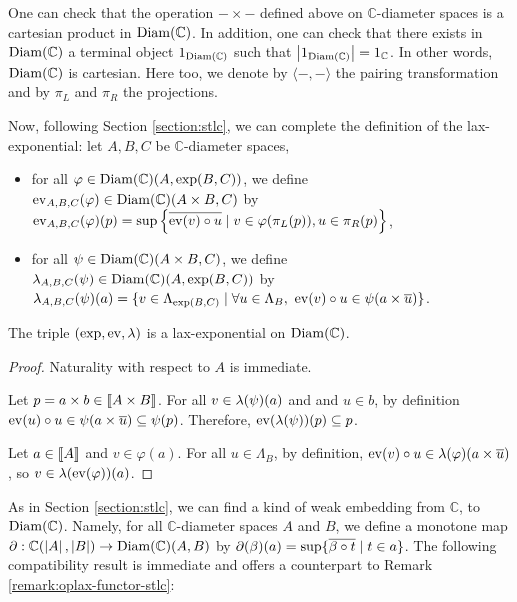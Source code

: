 One can check that the operation $-\times-$ defined above on $\mathbb{C}$-diameter spaces is a cartesian product in $\operatorname{Diam}(\mathbb{C})$. In addition, one can check that there exists in $\operatorname{Diam}(\mathbb{C})$ a terminal object $1_{\operatorname{Diam}(\mathbb{C})}$ such that $\left\vert1_{\operatorname{Diam}(\mathbb{C})}\right\vert = 1_{\mathbb{C}}$. In other words, $\operatorname{Diam}(\mathbb{C})$ is cartesian. Here too, we denote by $\langle-,-\rangle$ the pairing transformation and by $\pi_L$ and $\pi_R$ the projections.


Now, following Section \ref{section:stlc}, we can complete the definition of the lax-exponential: let $A,B,C$ be $\mathbb{C}$-diameter spaces, \begin{itemize}
\item for all $\varphi \in \operatorname{Diam}(\mathbb{C})(A, \exp(B, C))$, we define $\operatorname{ev}_{A,B,C}(\varphi) \in \operatorname{Diam}(\mathbb{C})\allowbreak(A \times B, C)$ by $\operatorname{ev}_{A,B,C}(\varphi)(p) = \sup\left\{ \overline{\operatorname{ev}(v) \circ u} \mid v \in \varphi(\pi_L(p)), u \in \pi_R(p) \right\}$,
\item for all $\psi \in \operatorname{Diam}(\mathbb{C})(A \times B, C)$, we define $\lambda_{A,B,C}(\psi) \in \operatorname{Diam}(\mathbb{C})(A,\allowbreak \exp(B, C))$ by $\lambda_{A,B,C}(\psi)(a) = \{ v \in \Lambda_{\exp(B, C)} \mid \forall u \in \Lambda_B,~ \operatorname{ev}(v) \circ u \in \psi(a \times \overline{u}) \}$.
\end{itemize}
 
 \begin{proposition} The triple $(\exp, \operatorname{ev}, \lambda)$ is a lax-exponential on $\operatorname{Diam}(\mathbb{C})$.
 \end{proposition}
 \begin{proof} Naturality with respect to $A$ is immediate.
 
Let $p = a \times b \in \llbracket A \times B \rrbracket$. For all $v \in \lambda(\psi)(a)$ and and $u \in b$, by definition $\operatorname{ev}(u) \circ u \in \psi(a \times \overline{u}) \subseteq \psi(p)$. Therefore, $\operatorname{ev}(\lambda(\psi))(p) \subseteq p$.
 
 Let $a \in \llbracket A \rrbracket$ and $v \in \varphi(a)$. For all $u \in \Lambda_B$,  by definition, $\operatorname{ev}(v) \circ u \in \lambda(\varphi)(a \times \overline{u})$, so $v \in \lambda(\operatorname{ev}(\varphi))(a)$.
\end{proof}
 
As in Section \ref{section:stlc}, we can find a kind of weak embedding from $\mathbb{C}$, to $\operatorname{Diam}(\mathbb{C})$. Namely, for all $\mathbb{C}$-diameter spaces $A$ and $B$, we define a monotone map $\partial : \mathbb{C}(\left\vert A\right\vert, \left\vert B\right\vert) \to \operatorname{Diam}\allowbreak(\mathbb{C})(A, B)$ by $\partial(\beta)(a) = \sup \{ \overline{\beta \circ t} \mid t \in a \}$. The following compatibility result is immediate and offers a counterpart to Remark \ref{remark:oplax-functor-stlc}:

